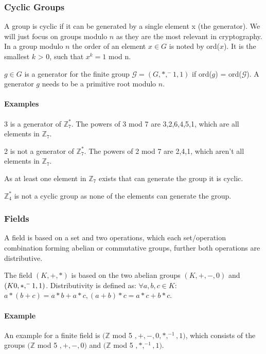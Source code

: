 \documentclass[a4paper,12pt]{scrartcl}
\begin{document}
\subsubsection{Cyclic Groups}

A group is cyclic if it can be generated by a single element x (the generator). We will just focus on groups modulo $n$ as they are the most relevant in cryptography. In a group modulo $n$ the order of an element $x\in G$ is noted by ord($x$). It is the smallest $k$ > 0, such that $x^k = 1$ mod n.

$g\in G$ is a generator for the finite group $\mathcal{G} = (G, *, ^-1, 1)$ if ord($g$) = ord($\mathcal{G}$). A generator $g$ needs to be a primitive root modulo $n$.

\paragraph{Examples}

3 is a generator of $\mathbb{Z}_7^*$. The powers of 3 mod 7 are 3,2,6,4,5,1, which are all elements in $\mathbb{Z}_7$.

2 is not a generator of $\mathbb{Z}_7^*$. The powers of 2 mod 7 are 2,4,1, which aren't all elements in $\mathbb{Z}_7$.

As at least one element in $\mathbb{Z}_7$ exists that can generate the group it is cyclic.

$\mathbb{Z}_4^*$ is not a cyclic group as none of the elements can generate the group.

\subsubsection{Fields}

A field is based on a set and two operations, which each set/operation combination forming abelian or commutative groups, further both operations are distributive.

The field $(K, +, *)$ is based on the two abelian groups $(K, +, -, 0)$ and $(K\\0, *, ^-1, 1)$. Distributivity is defined as: $\forall a,b,c\in K$: $a*(b+c) = a*b+a*c, (a+b)*c = a*c+b*c$.

\paragraph{Example}

An example for a finite field is $(\mathbb{Z}$ mod 5 $, +, -, 0, *, ^{-1}, 1)$, which consists of the groups $(\mathbb{Z}$ mod 5 $, +, -, 0)$ and $(\mathbb{Z}$ mod 5 $, *, ^{-1}, 1)$.
\end{document}
